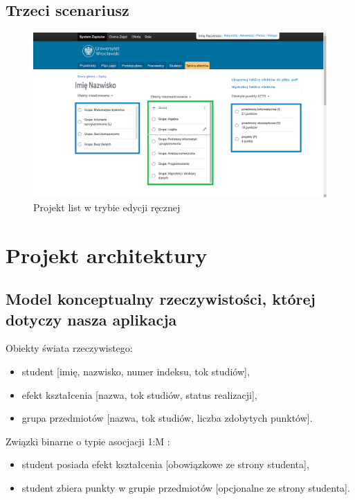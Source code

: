 \documentclass{article}
\begin{document}
\subsection{Trzeci scenariusz}
\begin{figure}[H]
	\begin{center}
		\caption{Projekt list w trybie edycji ręcznej}
		\includegraphics[scale=0.23]{edycja.png}
	\end{center}
\end{figure}


\section{Projekt architektury}

\subsection{Model konceptualny rzeczywistości, której dotyczy nasza aplikacja}
Obiekty świata rzeczywistego:
\begin{itemize}
 \item student [imię, nazwisko, numer indeksu, tok studiów],
 \item efekt kształcenia [nazwa, tok studiów, status realizacji],
 \item grupa przedmiotów [nazwa, tok studiów, liczba zdobytych punktów].
\end{itemize}
Związki binarne o typie asocjacji 1:M :
\begin{itemize}
 \item student posiada efekt kształcenia [obowiązkowe ze strony studenta],
 \item student zbiera punkty w grupie przedmiotów [opcjonalne ze strony studenta].
\end{itemize}
\end{document}
